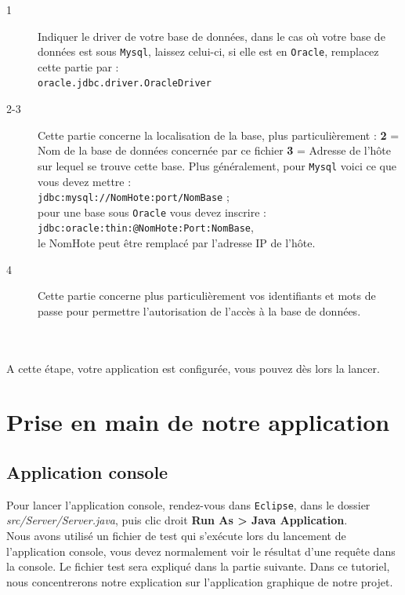 \documentclass[12pt]{article}
\begin{document}
	\begin{description}
		\item [1] Indiquer le driver de votre base de données, dans le cas où votre base de données est sous \texttt{Mysql}, laissez celui-ci, si elle est en \texttt{Oracle}, remplacez cette partie par : \\ \texttt{oracle.jdbc.driver.OracleDriver}
		\item [2-3] Cette partie concerne la localisation de la base, plus particulièrement :  \textbf{2} = Nom de la base de données concernée par ce fichier \textbf{3} = Adresse de l'hôte sur lequel se trouve cette base. Plus généralement, pour \texttt{Mysql} voici ce que vous devez mettre : \\ \texttt{jdbc:mysql://NomHote:port/NomBase} ;\\ pour une base sous \texttt{Oracle} vous devez inscrire : \\ \texttt{jdbc:oracle:thin:@NomHote:Port:NomBase}, \\ le NomHote peut être remplacé par l'adresse IP de l'hôte.
		\item [4] Cette partie concerne plus particulièrement vos identifiants et mots de passe pour permettre l'autorisation de l'accès à la base de données.		
	\end {description}
	
	\\
	\\
	\indent A cette étape, votre application est configurée, vous pouvez dès lors la lancer.
\newpage
\section {Prise en main de notre application}
	\subsection{Application console}
	Pour lancer l'application console, rendez-vous dans \texttt{Eclipse}, dans le dossier \textit{src/Server/Server.java}, puis clic droit \textbf{Run As > Java Application}. \\
	Nous avons utilisé un fichier de test qui s'exécute lors du lancement de l'application console, vous devez normalement voir le résultat d'une requête dans la console. Le fichier test sera expliqué dans la partie suivante.
	Dans ce tutoriel, nous concentrerons notre explication sur l'application graphique de notre projet.
\end{document}

